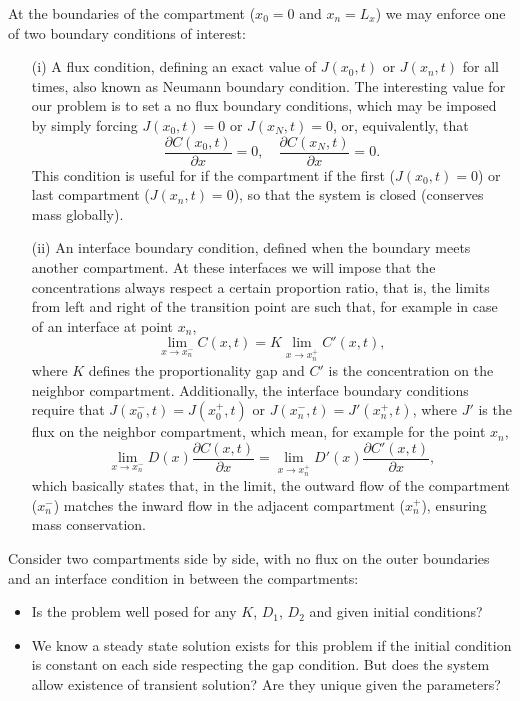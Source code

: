 \documentclass[final,1p,times]{elsarticle}
\begin{document}
At the boundaries of the compartment ($x_0=0$ and $x_n=L_x$) we may enforce one of two boundary conditions of interest:
\begin{enumerate}
\item[(i)] A flux condition, defining an exact value of $J(x_0, t)$ or $J(x_n, t)$ for all times, also known as Neumann boundary condition. The interesting value for our problem is to set a no flux boundary conditions, which may be imposed by simply forcing $J(x_0, t)=0$ or $J(x_N, t)=0$, or, equivalently, that
\begin{equation}
\frac{\partial C(x_0,t)}{\partial x}=0, \quad \frac{\partial C(x_N,t)}{\partial x}=0.
\end{equation}
This condition is useful for if the compartment if the first ($J(x_0, t)=0$) or last compartment ($J(x_n, t)=0$), so that the system is closed (conserves mass globally).
\item[(ii)] An interface boundary condition, defined when the boundary meets another compartment. At these interfaces we will impose that the concentrations always respect a certain proportion ratio, that is, the limits from left and right of the transition point are such that, for example in case of an interface at point $x_n$, 
\begin{equation}
\lim_{x\rightarrow x_n^{-}} C(x, t) = K \lim_{x\rightarrow x_n^{+}} C'(x, t),
\end{equation}
where $K$ defines the proportionality gap and $C'$ is the concentration on the neighbor compartment.
Additionally, the interface boundary conditions require that $J(x_0^-, t)=J(x_0^+, t)$ or  $J(x_n^-, t)=J'(x_n^+, t)$, where $J'$ is the flux on the neighbor compartment, which mean, for example for the point $x_n$,
\begin{equation}
\lim_{x\rightarrow x_n^-}D(x) \frac{\partial C(x,t)}{\partial x} = \lim_{x\rightarrow x_n^+} D'(x) \frac{\partial C'(x,t)}{\partial x},
\end{equation}
which basically states that, in the limit, the outward flow of the compartment ($x_n^{-}$) matches the inward flow in the adjacent compartment ($x_n^{+}$), ensuring mass conservation.

\end{enumerate}

Consider two compartments side by side, with no flux on the outer boundaries and an interface condition in between the compartments:
\begin{itemize}
\item Is the problem well posed for any $K$, $D_1$, $D_2$ and given initial conditions? 
\item We know a steady state solution exists for this problem if the initial condition is constant on each side respecting the gap condition. But does the system allow existence of transient solution? Are they unique given the parameters?

\end{itemize}
\end{document}
